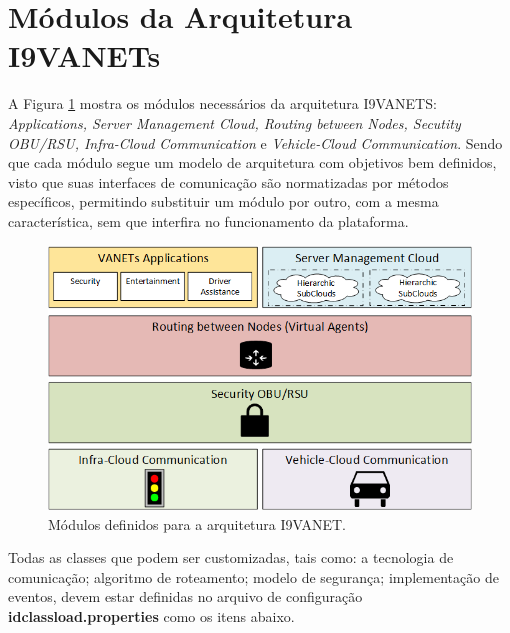 \documentclass[
	12pt,				%
	oneside,			%
	a4paper,			%
	english,			%
	brazil				%
	]{abntex2ppgsi}
\begin{document}
\section{Módulos da Arquitetura I9VANETs}

A Figura \ref{fig:dModulos} mostra os módulos necessários da arquitetura I9VANETS:  \textit{Applications, Server Management Cloud, Routing between Nodes, Secutity OBU/RSU, Infra-Cloud Communication} e \textit{Vehicle-Cloud Communication}. Sendo que cada módulo segue um modelo de arquitetura com objetivos bem definidos, visto que suas interfaces de comunicação são normatizadas por métodos específicos, permitindo substituir um módulo por outro, com a mesma característica, sem que interfira no funcionamento da plataforma.

\begin{figure}[h!]
	\centering
	\includegraphics [width=12cm,height=7cm] {images/modulos.png}
	\caption{Módulos definidos para a arquitetura I9VANET.}
	\label{fig:dModulos}
\end{figure}

Todas as classes que podem ser customizadas, tais como: a tecnologia de comunicação; algoritmo de roteamento; modelo de segurança; implementação de eventos, devem estar definidas no arquivo de configuração \textbf{idclassload.properties} como os itens abaixo.
\end{document}
